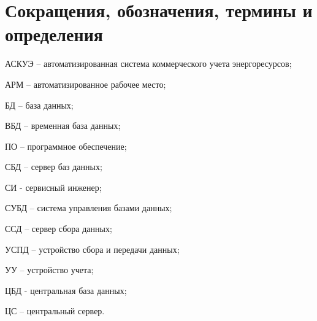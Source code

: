\newpage
\section*{Сокращения, обозначения, термины и определения}

АСКУЭ – автоматизированная система коммерческого учета энергоресурсов;

АРМ – автоматизированное рабочее место;

БД – база данных;

ВБД – временная база данных;

ПО – программное обеспечение;

СБД – сервер баз данных;

СИ - сервисный инженер;

СУБД – система управления базами данных;

ССД – сервер сбора данных;

УСПД – устройство сбора и передачи данных;

УУ – устройство учета;

ЦБД - центральная база данных;

ЦС – центральный сервер.